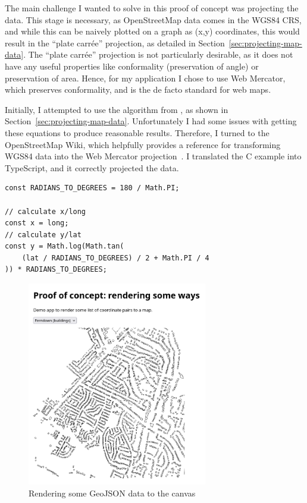 \documentclass[]{final_report}
\begin{document}
The main challenge I wanted to solve in this proof of concept was projecting the data. This stage is necessary, as OpenStreetMap data comes in the WGS84 CRS, and while this can be naively plotted on a graph as (x,y) coordinates, this would result in the ``plate carrée'' projection, as detailed in Section~\ref{sec:projecting-map-data}. The ``plate carrée'' projection is not particularly desirable, as it does not have any useful properties like conformality (preservation of angle) or preservation of area. Hence, for my application I chose to use Web Mercator, which preserves conformality, and is the de facto standard for web maps.

Initially, I attempted to use the algorithm from \textcite[41]{snyder1987map}, as shown in Section~\ref{sec:projecting-map-data}. Unfortunately I had some issues with getting these equations to produce reasonable results. Therefore, I turned to the OpenStreetMap Wiki, which helpfully provides a reference for transforming WGS84 data into the Web Mercator projection~\cite{osm-wiki-mercator}. I translated the C example into TypeScript, and it correctly projected the data.

\begin{lstlisting}[caption=Projecting to Web Mercator]
const RADIANS_TO_DEGREES = 180 / Math.PI;

// calculate x/long
const x = long;
// calculate y/lat
const y = Math.log(Math.tan(
    (lat / RADIANS_TO_DEGREES) / 2 + Math.PI / 4
)) * RADIANS_TO_DEGREES;
\end{lstlisting}

\begin{figure}[ht]
    \centering
    \includegraphics[width=0.7\textwidth]{../proof-of-concepts/2-rendering-a-way/screenshots/ferndown-buildings.png}
    \caption{Rendering some GeoJSON data to the canvas}
\end{figure}\label{fig:rendering-geometry}
\end{document}
